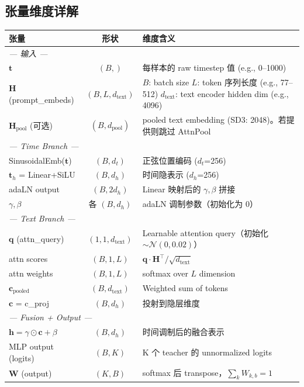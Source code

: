 \documentclass[11pt,a4paper]{article}
\begin{document}
\subsection{张量维度详解}

\begin{center}
\small
\begin{tabular}{lcp{7.5cm}}
\toprule
\textbf{张量} & \textbf{形状} & \textbf{维度含义} \\
\midrule
\multicolumn{3}{l}{\textit{--- 输入 ---}} \\
$\mathbf{t}$ & $(B,)$ & 每样本的 raw timestep 值 (e.g., 0--1000) \\
$\mathbf{H}$ (prompt\_embeds) & $(B, L, d_{\text{text}})$ &
    $B$: batch size \newline
    $L$: token 序列长度 (e.g., 77--512) \newline
    $d_{\text{text}}$: text encoder hidden dim (e.g., 4096) \\
$\mathbf{H}_{\text{pool}}$ (可选) & $(B, d_{\text{pool}})$ & pooled text embedding (SD3: 2048)。若提供则跳过 AttnPool \\
\midrule
\multicolumn{3}{l}{\textit{--- Time Branch ---}} \\
SinusoidalEmb($\mathbf{t}$) & $(B, d_t)$ & 正弦位置编码 ($d_t$=256) \\
$\mathbf{t}_h$ = Linear+SiLU & $(B, d_h)$ & 时间隐表示 ($d_h$=256) \\
adaLN output & $(B, 2d_h)$ & Linear 映射后的 $\gamma, \beta$ 拼接 \\
$\gamma, \beta$ & 各 $(B, d_h)$ & adaLN 调制参数（初始化为 0） \\
\midrule
\multicolumn{3}{l}{\textit{--- Text Branch ---}} \\
$\mathbf{q}$ (attn\_query) & $(1, 1, d_{\text{text}})$ & Learnable attention query（初始化 $\sim \mathcal{N}(0, 0.02)$） \\
attn scores & $(B, 1, L)$ & $\mathbf{q} \cdot \mathbf{H}^\top / \sqrt{d_{\text{text}}}$ \\
attn weights & $(B, 1, L)$ & softmax over $L$ dimension \\
$\mathbf{c}_{\text{pooled}}$ & $(B, d_{\text{text}})$ & Weighted sum of tokens \\
$\mathbf{c}$ = c\_proj & $(B, d_h)$ & 投射到隐层维度 \\
\midrule
\multicolumn{3}{l}{\textit{--- Fusion + Output ---}} \\
$\mathbf{h} = \gamma \odot \mathbf{c} + \beta$ & $(B, d_h)$ & 时间调制后的融合表示 \\
MLP output (logits) & $(B, K)$ & K 个 teacher 的 unnormalized logits \\
$\mathbf{W}$ (output) & $(K, B)$ & softmax 后 transpose，$\sum_k W_{k,b} = 1$ \\
\bottomrule
\end{tabular}
\end{center}
\end{document}
